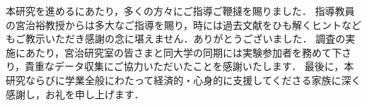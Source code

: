 本研究を進めるにあたり，多くの方々にご指導ご鞭撻を賜りました．
指導教員の宮治裕教授からは多大なご指導を賜り，時には過去文献をひも解くヒントなどもご教示いただき感謝の念に堪えません．ありがとうございました．
調査の実施にあたり，宮治研究室の皆さまと同大学の同期には実験参加者を務めて下さり，貴重なデータ収集にご協力いただいたことを感謝いたします．
最後に，本研究ならびに学業全般にわたって経済的・心身的に支援してくださる家族に深く感謝し，お礼を申し上げます．
